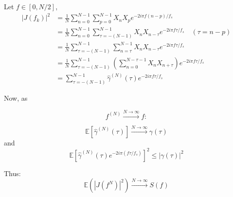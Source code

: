 \documentclass[11pt]{article}
\begin{document}
\begin{solution}

Let $f \in [0, N/2]$,
\begin{align*}
| J(f_k) |^2 &= \frac{1}{N} \sum_{n=0}^{N-1} \sum_{p=0}^{N-1} X_n X_p e^{-2i\pi f(n-p)/f_s} \\
&= \frac{1}{N} \sum_{n=0}^{N-1} \sum_{\tau=-(N-1)}^{N-1} X_n X_{n-\tau} e^{-2i\pi f\tau/f_s } \quad (\tau = n - p) \\
&= \frac{1}{N} \sum_{\tau=-(N-1)}^{N-1} \sum_{n=\tau}^{N-1} X_n X_{n-\tau} e^{-2i\pi f\tau/f_s } \\
&= \frac{1}{N} \sum_{\tau=-(N-1)}^{N-1} \left( \sum_{n=0}^{N-\tau-1} X_n X_{n+\tau} \right) e^{-2i\pi f\tau/f_s} \\
&= \sum_{\tau=-(N-1)}^{N-1} \hat{\gamma}^{(N)}(\tau) e^{-2i\pi f\tau/f_s }
\end{align*}

Now, as 

\[
f^{(N)} \xrightarrow{N \to \infty} f:
\]

\[
\mathbb{E} [\hat{\gamma}^{(N)}(\tau)] \xrightarrow{N \to \infty} \gamma(\tau)
\]
and
\[
\mathbb{E} \left[ \hat{\gamma}^{(N)}(\tau) e^{-2i\pi(f\tau/f_s)} \right]^2 \leq |\gamma(\tau)|^2
\]

Thus:
\[
\mathbb{E} \left( | J(f^N) |^2 \right) \xrightarrow{N \to \infty} S(f)
\]
    
\end{solution}
\end{document}
